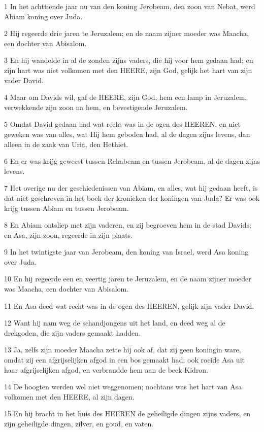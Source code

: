 \par 1 In het achttiende jaar nu van den koning Jerobeam, den zoon van Nebat, werd Abiam koning over Juda.
\par 2 Hij regeerde drie jaren te Jeruzalem; en de naam zijner moeder was Maacha, een dochter van Abisalom.
\par 3 En hij wandelde in al de zonden zijns vaders, die hij voor hem gedaan had; en zijn hart was niet volkomen met den HEERE, zijn God, gelijk het hart van zijn vader David.
\par 4 Maar om Davids wil, gaf de HEERE, zijn God, hem een lamp in Jeruzalem, verwekkende zijn zoon na hem, en bevestigende Jeruzalem.
\par 5 Omdat David gedaan had wat recht was in de ogen des HEEREN, en niet geweken was van alles, wat Hij hem geboden had, al de dagen zijns levens, dan alleen in de zaak van Uria, den Hethiet.
\par 6 En er was krijg geweest tussen Rehabeam en tussen Jerobeam, al de dagen zijns levens.
\par 7 Het overige nu der geschiedenissen van Abiam, en alles, wat hij gedaan heeft, is dat niet geschreven in het boek der kronieken der koningen van Juda? Er was ook krijg tussen Abiam en tussen Jerobeam.
\par 8 En Abiam ontsliep met zijn vaderen, en zij begroeven hem in de stad Davids; en Asa, zijn zoon, regeerde in zijn plaats.
\par 9 In het twintigste jaar van Jerobeam, den koning van Israel, werd Asa koning over Juda.
\par 10 En hij regeerde een en veertig jaren te Jeruzalem, en de naam zijner moeder was Maacha, een dochter van Abisalom.
\par 11 En Asa deed wat recht was in de ogen des HEEREN, gelijk zijn vader David.
\par 12 Want hij nam weg de schandjongens uit het land, en deed weg al de drekgoden, die zijn vaders gemaakt hadden.
\par 13 Ja, zelfs zijn moeder Maacha zette hij ook af, dat zij geen koningin ware, omdat zij een afgrijselijken afgod in een bos gemaakt had; ook roeide Asa uit haar afgrijselijken afgod, en verbrandde hem aan de beek Kidron.
\par 14 De hoogten werden wel niet weggenomen; nochtans was het hart van Asa volkomen met den HEERE, al zijn dagen.
\par 15 En hij bracht in het huis des HEEREN de geheiligde dingen zijns vaders, en zijn geheiligde dingen, zilver, en goud, en vaten.
